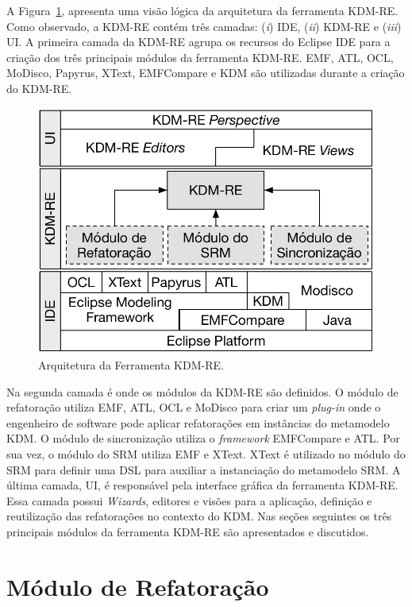 A Figura~\ref{fig:arquitetura_ferramenta_kdm_re}, apresenta uma visão lógica da arquitetura da ferramenta KDM-RE. Como observado, a KDM-RE contém três camadas: (\textit{i}) IDE, (\textit{ii}) KDM-RE e (\textit{iii}) UI. A primeira camada da KDM-RE agrupa os recursos do Eclipse IDE para a criação dos três principais módulos da ferramenta KDM-RE. EMF, ATL, OCL, MoDisco, Papyrus, XText, EMFCompare e KDM são utilizadas durante a criação do KDM-RE.

\begin{figure}[h]
	\centering
	\caption{Arquitetura da Ferramenta KDM-RE.}
	\label{fig:arquitetura_ferramenta_kdm_re}
	\includegraphics[scale=0.75]{images/arquitetura_KDM-RE}
	\fautor
\end{figure}

Na segunda camada é onde os módulos da KDM-RE são definidos. O módulo de refatoração utiliza EMF, ATL, OCL e MoDisco para criar um \textit{plug-in} onde o engenheiro de software pode aplicar refatorações em instâncias do metamodelo KDM. O módulo de sincronização utiliza o \textit{framework} EMFCompare e ATL. Por sua vez, o módulo do SRM utiliza EMF e XText. XText é utilizado no módulo do SRM para definir uma DSL para auxiliar a instanciação do metamodelo SRM. A última camada, UI, é responsável pela interface gráfica da ferramenta KDM-RE. Essa camada possui \textit{Wizards}, editores e visões para a aplicação, definição e reutilização das refatorações no contexto do KDM. Nas seções seguintes os três principais módulos da ferramenta KDM-RE são apresentados e discutidos.


\section{Módulo de Refatoração}\label{sec:modulo_de_refatoracao_kdm_re}

